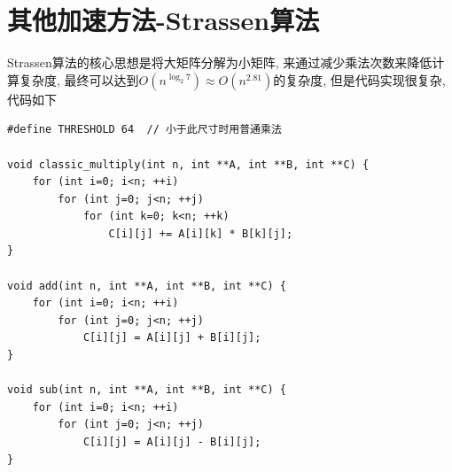 \documentclass[11pt]{article}
\begin{document}
\section{其他加速方法-Strassen算法}
Strassen算法的核心思想是将大矩阵分解为小矩阵, 来通过减少乘法次数来降低计算复杂度, 
最终可以达到$O(n^{\log_2 7}) \approx O(n^{2.81})$的复杂度, 但是代码实现很复杂, 代码如下
{\setmainfont{Courier New Bold}                                        
    \begin{lstlisting}
#define THRESHOLD 64  // 小于此尺寸时用普通乘法

void classic_multiply(int n, int **A, int **B, int **C) {
    for (int i=0; i<n; ++i)
        for (int j=0; j<n; ++j)
            for (int k=0; k<n; ++k)
                C[i][j] += A[i][k] * B[k][j];
}

void add(int n, int **A, int **B, int **C) {
    for (int i=0; i<n; ++i)
        for (int j=0; j<n; ++j)
            C[i][j] = A[i][j] + B[i][j];
}

void sub(int n, int **A, int **B, int **C) {
    for (int i=0; i<n; ++i)
        for (int j=0; j<n; ++j)
            C[i][j] = A[i][j] - B[i][j];
}


\end{lstlisting}}
\end{document}
